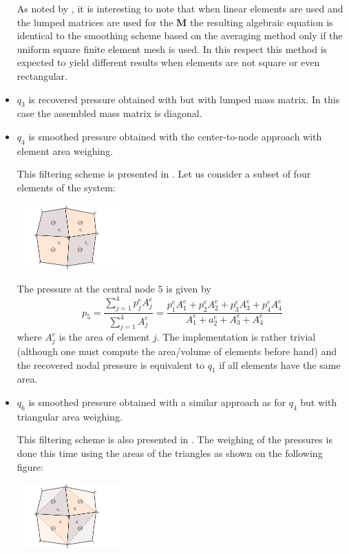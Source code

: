 \begin{itemize}
As noted by \cite{zina82}, it is interesting to note that when linear elements are used and the lumped matrices
are used for the ${\bm M}$ the resulting algebraic equation is identical to the smoothing scheme based
on the averaging method only if the uniform square finite element mesh is used. 
In this respect this method is expected to yield different results when elements are not square or even rectangular.



\item $q_3$ is recovered pressure obtained with \cite{zina82} but with lumped mass matrix. In this case the assembled mass matrix is diagonal.

\item $q_4$ is smoothed pressure obtained with the center-to-node approach with element area weighing.

This filtering scheme is presented in \cite{sagl81a}. Let us consider a subset of four elements
of the system:
\begin{center}
\includegraphics[width=4cm]{python_codes/fieldstone_12/images/smooth9}
\end{center}

The pressure at the central node $5$ is given by 
\[
p_5 = \frac{\sum\limits_{j=1}^4 p_j^e A_j^e}{\sum\limits_{j=1}^4 A_j^e}
=
\frac{  p_1^e A_1^e+p_2^e A_2^e+p_3^e A_3^e+p_4^e A_4^e
}{ A_1^e + a_2^e + A_3^e + A_4^e}
\]
where $A_j^e$ is the area of element $j$.
The implementation is rather trivial (although one must compute the area/volume of elements before hand)
and the recovered nodal pressure is equivalent to $q_1$ if all elements have the same area.

\item $q_6$ is smoothed pressure obtained with a similar approach as for $q_4$ but 
with triangular area weighing.


This filtering scheme is also presented in \cite{sagl81a}. 
The weighing of the pressures is done this time using the areas of the triangles as shown 
on the following figure:
\begin{center}
\includegraphics[width=4cm]{python_codes/fieldstone_12/images/smooth9_T}
\end{center}


\end{itemize}
